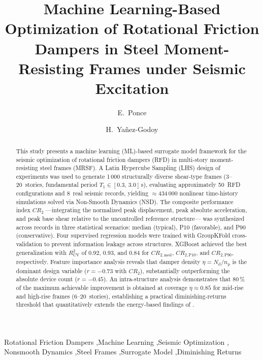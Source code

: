 \documentclass[preprint,12pt,authoryear]{elsarticle}
\newcommand{\CR}[1]{CR_{2,\text{#1}}}
\newcommand{\Rsq}{R^{2}_{\mathrm{CV}}}
\newcommand{\nd}{N_{\mathrm{d}}}
\newcommand{\np}{n_{\mathrm{p}}}              %
\newcommand{\etad}{\eta}
\begin{document}
\begin{frontmatter}

\title{Machine Learning-Based Optimization of Rotational Friction Dampers in
       Steel Moment-Resisting Frames under Seismic Excitation}

\author[uaq]{E.~Ponce}
\author[i2m]{H.~Yañez-Godoy}

\address[uaq]{Universidad Autónoma de Querétaro, Faculty of Engineering,
              Cerro de las Campanas s/n, Querétaro, Mexico}
\address[i2m]{Arts et Metiers Institute of Technology, University of Bordeaux,
              Centre National de la Recherche Scientifique (CNRS),
              Bordeaux INP, I2M, UMR 5295, 33400 Talence, France}

\begin{abstract}
This study presents a machine learning (ML)-based surrogate model framework for the
seismic optimization of rotational friction dampers (RFD) in multi-story
moment-resisting steel frames (MRSF). A Latin Hypercube Sampling (LHS) design of
experiments was used to generate 1\,000 structurally diverse shear-type frames
(3--20~stories, fundamental period $T_1 \in [0.3,\,3.0]$\,s), evaluating
approximately 50~RFD configurations and 8~real seismic records, yielding
$\approx$434\,000 nonlinear time-history simulations solved via Non-Smooth Dynamics
(NSD). The composite performance index $CR_2$ ---integrating the normalized peak
displacement, peak absolute acceleration, and peak base shear relative to the
uncontrolled reference structure--- was synthesized across records in three statistical
scenarios: median (typical), P10 (favorable), and P90 (conservative). Four supervised
regression models were trained with GroupKFold cross-validation to prevent information
leakage across structures. XGBoost achieved the best generalization with $\Rsq$ of
0.92, 0.93, and 0.84 for $\CR{med}$, $\CR{P10}$, and $\CR{P90}$, respectively.
Feature importance analysis reveals that damper density $\etad = \nd/\np$ is the
dominant design variable ($r=-0.73$ with $CR_2$), substantially outperforming the
absolute device count ($r=-0.45$). An intra-structure analysis demonstrates that
80\,\% of the maximum achievable improvement is obtained at coverage
$\etad \approx 0.85$ for mid-rise and high-rise frames (6--20~stories), establishing
a practical diminishing-returns threshold that quantitatively extends the energy-based
findings of \citet{Jarrahi2020sdee}.
\end{abstract}

\begin{keyword}
Rotational Friction Dampers \sep Machine Learning \sep Seismic Optimization \sep
Nonsmooth Dynamics \sep Steel Frames \sep Surrogate Model \sep Diminishing Returns
\end{keyword}

\end{frontmatter}
\end{document}
